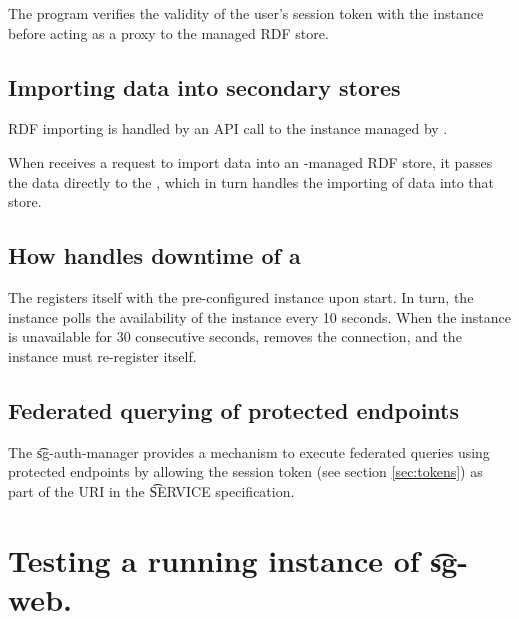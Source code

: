 
  The  program verifies the validity of the user's session
  token with the  instance before acting as a proxy to the managed
  RDF store.

\subsection{Importing data into secondary stores}

  RDF importing is handled by an API call to the instance managed by
  .

  When  receives a request to import data into an
  -managed RDF store, it passes the data directly
  to the , which in turn handles the importing of data
  into that store.

\subsection{How  handles downtime of a }

  The  registers itself with the pre-configured
   instance upon start.  In turn, the  instance
  polls the availability of the  instance every 10
  seconds.  When the  instance is unavailable for 30
  consecutive seconds,  removes the connection, and the
   instance must re-register itself.

\subsection{Federated querying of protected endpoints}

  The \t{sg-auth-manager} provides a mechanism to execute federated queries
  using protected endpoints by allowing the session token (see section
  \ref{sec:tokens}) as part of the URI in the \t{SERVICE} specification.

\pagebreak{}
\section{Testing a running instance of \t{sg-web}.}

